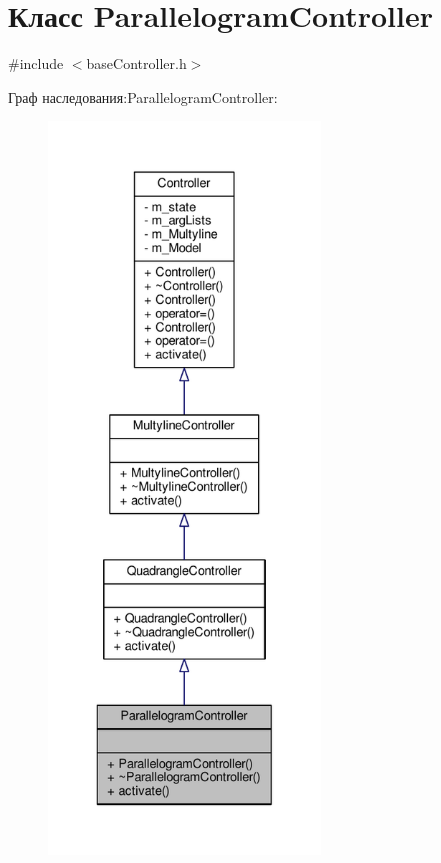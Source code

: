 \hypertarget{class_parallelogram_controller}{\section{Класс Parallelogram\-Controller}
\label{class_parallelogram_controller}
}


{\ttfamily \#include $<$base\-Controller.\-h$>$}



Граф наследования\-:Parallelogram\-Controller\-:
\nopagebreak
\begin{figure}[H]
\begin{center}
\leavevmode
\includegraphics[height=550pt]{class_parallelogram_controller__inherit__graph}
\end{center}
\end{figure}


